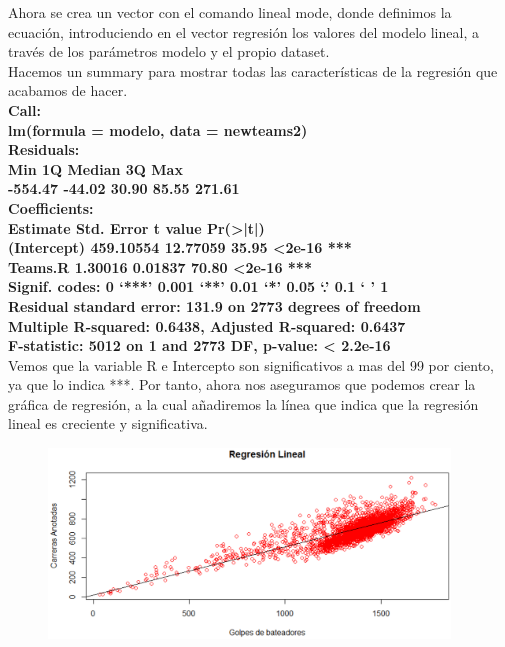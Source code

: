 \documentclass[10pt]{article}
\begin{document}
Ahora se crea un vector con el comando lineal mode, donde definimos la ecuación, introduciendo en el vector regresión los valores del modelo lineal, a través de los parámetros modelo y el propio dataset.\\

Hacemos un summary para mostrar todas las características de la regresión que acabamos de hacer.\\

\textbf{Call:}\\
\textbf{lm(formula = modelo, data = newteams2)}\\

\textbf{Residuals:}\\
        \textbf{Min       1Q    Median    3Q     Max}\\
     \textbf{-554.47 -44.02   30.90    85.55  271.61}\\

\textbf{Coefficients:}\\
                     \textbf{Estimate      Std. Error t value     Pr(>|t|)}\\
\textbf{(Intercept)   459.10554     12.77059 35.95     <2e-16 ***}\\
\textbf{Teams.R      1.30016          0.01837 70.80     <2e-16 ***}\\

\textbf{Signif. codes: 0 ‘***’ 0.001 ‘**’ 0.01 ‘*’ 0.05 ‘.’ 0.1 ‘ ’ 1}\\

\textbf{Residual standard error: 131.9 on 2773 degrees of freedom}\\
\textbf{Multiple R-squared: 0.6438, Adjusted R-squared: 0.6437}\\
\textbf{F-statistic: 5012 on 1 and 2773 DF, p-value: < 2.2e-16}\\

Vemos que la variable R e Intercepto son significativos a mas del 99 por ciento, ya que lo indica ***. Por tanto, ahora nos aseguramos que podemos crear la gráfica de regresión, a la cual añadiremos la línea que indica que la regresión lineal es creciente y significativa.\\

\begin{figure}[H]
	\begin{center}
 		\includegraphics[width = 0.95\textwidth]{Imagenes/regresion1.eps}
	\end{center} 
\end{figure}
\end{document}
